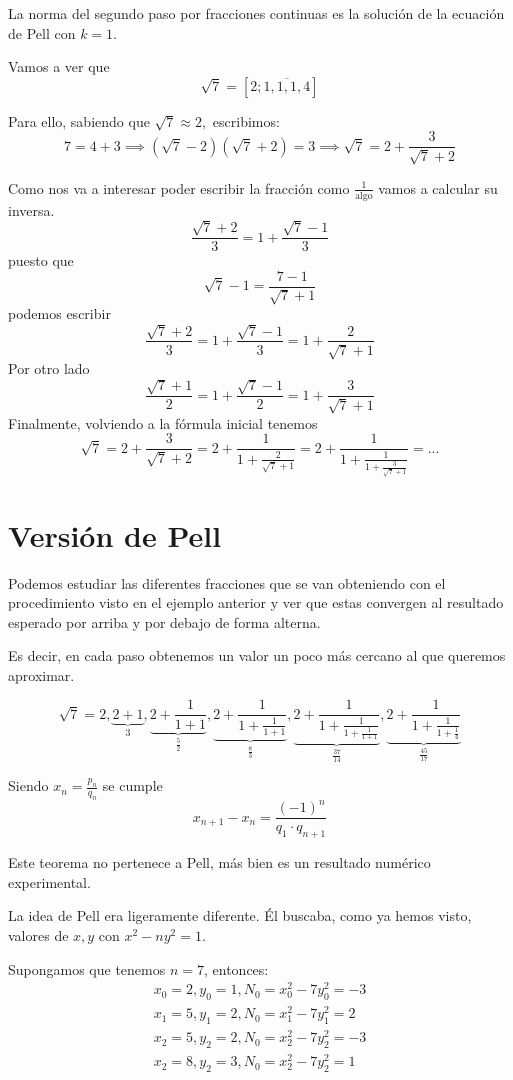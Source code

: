 \documentclass{apuntes}
\begin{document}
La norma del segundo paso por fracciones continuas es la solución de la ecuación de Pell con $k=1$.

\begin{example}
Vamos a ver que
\[\sqrt{7} = [2; \overline{1,1,1,4}]\]

Para ello, sabiendo que $\sqrt{7} \approx 2,$ escribimos:
\[7 =4+3 \implies (\sqrt{7}-2)(\sqrt{7}+2) = 3 \implies \sqrt{7} = 2+\frac{3}{\sqrt{7}+2}\]

Como nos va a interesar poder escribir la fracción como $\frac{1}{\text{algo}}$ vamos a calcular su inversa.
\[\frac{\sqrt{7}+2}{3} = 1 +\frac{\sqrt{7}-1}{3}\]
puesto que
\[\sqrt{7}-1 = \frac{7-1}{\sqrt{7}+1}\]
podemos escribir
\[\frac{\sqrt{7}+2}{3} = 1 +\frac{\sqrt{7}-1}{3} = 1 +\frac{2}{\sqrt{7}+1}\]
Por otro lado
\[\frac{\sqrt{7}+1}{2} = 1+\frac{\sqrt{7}-1}{2} = 1+\frac{3}{\sqrt{7}+1}\]
Finalmente, volviendo a la fórmula inicial tenemos
\[\sqrt{7} =  2+\frac{3}{\sqrt{7}+2} = 2+ \frac{1}{1+\frac{2}{\sqrt{7}+1}}=2+\frac{1}{1+\frac{1}{1+\frac{3}{\sqrt{7}+1}}}=...\]
\end{example}

\section{Versión de Pell}
Podemos estudiar las diferentes fracciones que se van obteniendo con el procedimiento visto en el ejemplo anterior y ver que estas convergen al resultado esperado por arriba y por debajo de forma alterna.

Es decir, en cada paso obtenemos un valor un poco más cercano al que queremos aproximar.

\[\sqrt{7} = 2, \underbrace{2+1}_{3}, \underbrace{2+\frac{1}{1+1}}_{\frac{5}{2}}, \underbrace{2+\frac{1}{1+\frac{1}{1+1}}}_{\frac{8}{3}},  \underbrace{2+\frac{1}{1+\frac{1}{1+\frac{1}{1+1}}}}_{\frac{37}{14}},  \underbrace{2+\frac{1}{1+\frac{1}{1+\frac{1}{4}}}}_{\frac{45}{17}}\]

\begin{theorem}
Siendo $x_n = \frac{p_n}{q_n}$ se cumple
\[x_{n+1}-x_n = \frac{(-1)^n}{q_1 \cdot q_{n+1}}\]
\end{theorem}

Este teorema no pertenece a Pell, más bien es un resultado numérico experimental.

La idea de Pell era ligeramente diferente. Él buscaba, como ya hemos visto, valores de $x,y$ con $x^2-ny^2 = 1$.

Supongamos que tenemos $n=7$, entonces:
\[\begin{array}{l}
x_0=2, y_0 =1, N_0 = x_0^2-7y_0^2 = -3 \\
x_1=5, y_1 =2, N_0 = x_1^2-7y_1^2 = 2 \\
x_2=5, y_2 =2, N_0 = x_2^2-7y_2^2 = -3 \\
x_2=8, y_2 =3, N_0 = x_2^2-7y_2^2 = 1
\end{array}\]
\end{document}
